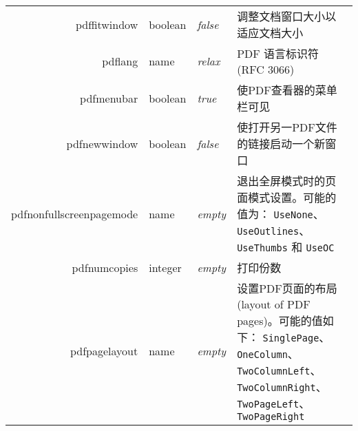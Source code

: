 \documentclass{article}
\begin{document}
\begin{longtable}{@{}>{\ttfamily}r>{\raggedright}p{}>{\itshape}lp{7cm}@{}}
  pdffitwindow        & boolean        & false                     & 调整文档窗口大小以适应文档大小                                                                                                                                                                                                              \\
  pdflang             & name           & relax                     & PDF 语言标识符 (RFC 3066)                                                                                                                                                                                                         \\
  pdfmenubar          & boolean        & true                      & 使PDF查看器的菜单栏可见                                                                                                                                                                                                                \\
  pdfnewwindow        & boolean        & false                     & 使打开另一PDF文件的链接启动一个新窗口                                                                                                                                                                                                         \\
  pdfnonfullscreenpagemode
                      & name           & empty                     & 退出全屏模式时的页面模式设置。可能的值为：
  \verb|UseNone|、\verb|UseOutlines|、\verb|UseThumbs| 和 \verb|UseOC|                                                                                                                                                                                                                               \\
  pdfnumcopies        & integer        & empty                     & 打印份数                                                                                                                                                                                                                         \\
  pdfpagelayout       & name           & empty                     & 设置PDF页面的布局(layout of PDF pages)。可能的值如下：
  \verb|SinglePage|、\verb|OneColumn|、
  \verb|TwoColumnLeft|、\verb|TwoColumnRight|、
  \verb|TwoPageLeft|、\verb|TwoPageRight|                                                                                                                                                                                                                                                          \\

\end{longtable}
\end{document}
